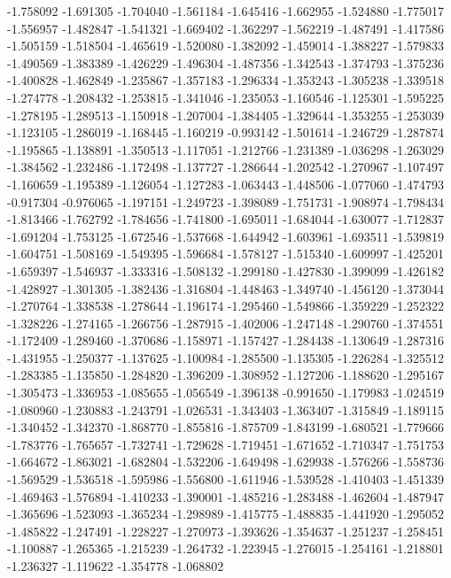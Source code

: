 -1.758092
-1.691305
-1.704040
-1.561184
-1.645416
-1.662955
-1.524880
-1.775017
-1.556957
-1.482847
-1.541321
-1.669402
-1.362297
-1.562219
-1.487491
-1.417586
-1.505159
-1.518504
-1.465619
-1.520080
-1.382092
-1.459014
-1.388227
-1.579833
-1.490569
-1.383389
-1.426229
-1.496304
-1.487356
-1.342543
-1.374793
-1.375236
-1.400828
-1.462849
-1.235867
-1.357183
-1.296334
-1.353243
-1.305238
-1.339518
-1.274778
-1.208432
-1.253815
-1.341046
-1.235053
-1.160546
-1.125301
-1.595225
-1.278195
-1.289513
-1.150918
-1.207004
-1.384405
-1.329644
-1.353255
-1.253039
-1.123105
-1.286019
-1.168445
-1.160219
-0.993142
-1.501614
-1.246729
-1.287874
-1.195865
-1.138891
-1.350513
-1.117051
-1.212766
-1.231389
-1.036298
-1.263029
-1.384562
-1.232486
-1.172498
-1.137727
-1.286644
-1.202542
-1.270967
-1.107497
-1.160659
-1.195389
-1.126054
-1.127283
-1.063443
-1.448506
-1.077060
-1.474793
-0.917304
-0.976065
-1.197151
-1.249723
-1.398089
-1.751731
-1.908974
-1.798434
-1.813466
-1.762792
-1.784656
-1.741800
-1.695011
-1.684044
-1.630077
-1.712837
-1.691204
-1.753125
-1.672546
-1.537668
-1.644942
-1.603961
-1.693511
-1.539819
-1.604751
-1.508169
-1.549395
-1.596684
-1.578127
-1.515340
-1.609997
-1.425201
-1.659397
-1.546937
-1.333316
-1.508132
-1.299180
-1.427830
-1.399099
-1.426182
-1.428927
-1.301305
-1.382436
-1.316804
-1.448463
-1.349740
-1.456120
-1.373044
-1.270764
-1.338538
-1.278644
-1.196174
-1.295460
-1.549866
-1.359229
-1.252322
-1.328226
-1.274165
-1.266756
-1.287915
-1.402006
-1.247148
-1.290760
-1.374551
-1.172409
-1.289460
-1.370686
-1.158971
-1.157427
-1.284438
-1.130649
-1.287316
-1.431955
-1.250377
-1.137625
-1.100984
-1.285500
-1.135305
-1.226284
-1.325512
-1.283385
-1.135850
-1.284820
-1.396209
-1.308952
-1.127206
-1.188620
-1.295167
-1.305473
-1.336953
-1.085655
-1.056549
-1.396138
-0.991650
-1.179983
-1.024519
-1.080960
-1.230883
-1.243791
-1.026531
-1.343403
-1.363407
-1.315849
-1.189115
-1.340452
-1.342370
-1.868770
-1.855816
-1.875709
-1.843199
-1.680521
-1.779666
-1.783776
-1.765657
-1.732741
-1.729628
-1.719451
-1.671652
-1.710347
-1.751753
-1.664672
-1.863021
-1.682804
-1.532206
-1.649498
-1.629938
-1.576266
-1.558736
-1.569529
-1.536518
-1.595986
-1.556800
-1.611946
-1.539528
-1.410403
-1.451339
-1.469463
-1.576894
-1.410233
-1.390001
-1.485216
-1.283488
-1.462604
-1.487947
-1.365696
-1.523093
-1.365234
-1.298989
-1.415775
-1.488835
-1.441920
-1.295052
-1.485822
-1.247491
-1.228227
-1.270973
-1.393626
-1.354637
-1.251237
-1.258451
-1.100887
-1.265365
-1.215239
-1.264732
-1.223945
-1.276015
-1.254161
-1.218801
-1.236327
-1.119622
-1.354778
-1.068802
